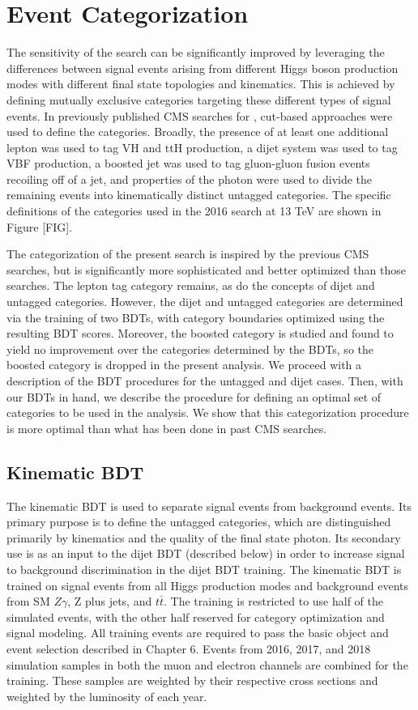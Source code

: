 \chapter{Event Categorization}
The sensitivity of the \hzg search can be significantly improved by leveraging the differences between signal events
arising from different Higgs boson production modes with different final state topologies and kinematics. 
This is achieved by defining mutually exclusive categories targeting these different types of signal events. In previously 
published CMS searches for \hzg [REFS], cut-based approaches were used to define the categories. Broadly, the presence of at least 
one additional lepton was used to tag VH and ttH production, a dijet system was used to tag VBF production, a boosted jet was 
used to tag gluon-gluon fusion events recoiling off of a jet, and properties of the photon were used to divide the remaining 
events into kinematically distinct untagged categories. The specific definitions of the categories used in the 2016 search 
at 13 TeV are shown in Figure [FIG]. 

The categorization of the present search is inspired by the previous CMS searches, but is significantly more sophisticated and 
better optimized than those searches. The lepton tag category remains, as do the concepts of dijet and untagged categories. 
However, the dijet and untagged categories are determined via the training of two BDTs, with category 
boundaries optimized using the resulting BDT scores. Moreover, the boosted category is studied and found to yield no 
improvement over the categories determined by the BDTs, so the boosted category is dropped in the present analysis. We proceed with 
a description of the BDT procedures for the untagged and dijet cases. Then, with our BDTs in hand, we describe the procedure 
for defining an optimal set of categories to be used in the analysis. We show that this categorization procedure is more 
optimal than what has been done in past CMS searches. 

\section{Kinematic BDT}
The kinematic BDT is used to separate \hzg signal events from background events. Its primary purpose is to define the 
untagged categories, which are distinguished primarily by kinematics and the quality of the final state photon. Its secondary 
use is as an input to the dijet BDT (described below) in order to increase signal to background discrimination in the 
dijet BDT training. The kinematic BDT is trained on \hzg signal events from all Higgs production modes and background events from 
SM $Z\gamma$, Z plus jets, and $t\bar{t}$. The training is restricted to use half of the simulated events, with the other half 
reserved for category optimization and signal modeling. All training events are required to pass the basic object and 
event selection described in Chapter 6. Events from 2016, 2017, and 2018 simulation samples in both the muon and electron channels 
are combined for the training. These samples are weighted by their respective cross sections and weighted by the luminosity of
each year. 

